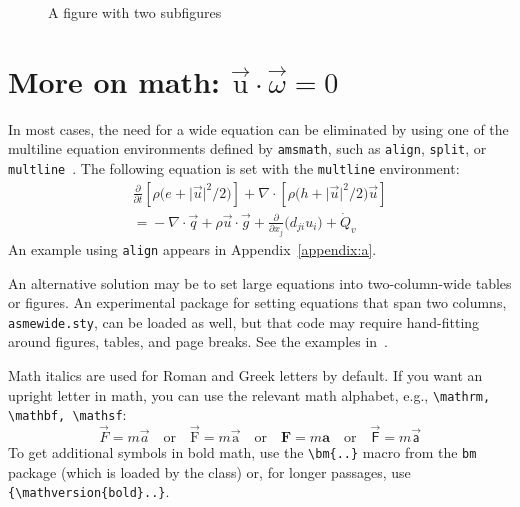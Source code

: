 \documentclass[captionpatch,colorlinks,upint,subscriptcorrection,varvw,mathalfa=cal=boondoxo,german]{asmeconf}
\begin{document}
\begin{figure}
\begin{subfigure}[b]{\columnwidth}
{}%
\end{subfigure}
\caption{A figure with two subfigures~\cite{lienhard2020}\label{fig:2}}
\end{figure}




\section[More on math: u\cdot\omega=0]{More on math: $\vec{\mathrm{u}}\cdot\vec{\omega}=0$}\label{sec:moremath}

In most cases, the need for a wide equation can be eliminated by using one of the multiline equation environments defined by 
\texttt{amsmath}, such as \texttt{align}, \texttt{split}, or \texttt{multline}~\cite{amsmath}. The following equation is set with the 
\texttt{multline} environment:
\begin{multline}\label{eqn:energy}
\frac{\partial}{\partial t}\left[\rho\bigl(e + \lvert\vec{u}\rvert^2\big/2\bigr)\right]  + \nabla\cdot\left[\rho\bigl(h + \lvert\vec{u}\rvert^2\big/2 \bigr)\vec{u}\right] \\
 ={}-\nabla \cdot \vec{q} +  \rho \vec{u}\cdot\vec{g}+ \frac{\partial}{\partial x_j}\bigl(d_{ji}u_i\bigr) + \dot{Q}_v
\end{multline}
An example using \texttt{align} appears in Appendix~\ref{appendix:a}.

An alternative solution may be to set large equations into two-column-wide tables or figures. An experimental package for setting equations that span two columns, \texttt{asmewide.sty}, can be loaded as well, but that code may require hand-fitting around figures, tables, and page breaks. See the examples in~\cite{lienhard2022}.

Math italics are used for Roman and Greek letters by default.  If you want an upright letter in math, you can use the relevant math alphabet, e.g., \verb|\mathrm, \mathbf, \mathsf|:
\begin{equation}\label{eqn:dw}
\vec{F} = m \vec{a} \quad\textrm{or}\quad \vec{\mathrm{F}} = m \vec{\mathrm{a}} \quad\textrm{or}\quad \mathbf{F} = m \mathbf{a} \quad\textrm{or}\quad \vec{\mathsf{F}} = m \vec{\mathsf{a}}
\end{equation}
To get additional symbols in bold math, use the \verb|\bm{..}| macro from the \texttt{bm} package (which is loaded by the class) or, for longer passages, use \verb|{\mathversion{bold}..|\texttt{\}}.
\end{document}
